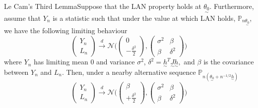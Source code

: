 \documentclass[twoside]{article}
\newcommand{\prob}{\mathbb{P}}
\newcommand{\utilde}{\underset{\sim}}
\begin{document}
\begin{theorem_exam}{Le Cam's Third Lemma}{}Suppose that the LAN property holds at $\utilde{\theta_0}$. Furthermore, assume that $Y_n$ is a statistic such that under the value at which LAN holds, $\prob_{n\utilde{\theta_0}}$, we have the following limiting behaviour 
\begin{equation}
\begin{pmatrix}
Y_n\\
L_n
\end{pmatrix}
 \xrightarrow{d} \mathcal{N}
\bigg( 
\begin{pmatrix}
0 \\
-\frac{\delta^2}{2}
\end{pmatrix}
,
\begin{pmatrix}
\sigma^2 & \beta \\
\beta & \delta^2
\end{pmatrix}
\bigg)
\tag{*}
\end{equation}
where $Y_n$ has limiting mean $0$ and variance $\sigma^2$, $\delta^2 = \utilde{h}^T\utilde{J}\utilde{h},$ and $\beta$ is the covariance between $Y_n$ and $L_n.$ Then, under a nearby alternative sequence $\prob_{n(\utilde{\theta_0} + n^{-1/2}\utilde{h})}$
\begin{equation}
\begin{pmatrix}
Y_n\\
L_n
\end{pmatrix}
 \xrightarrow{d} \mathcal{N}
\bigg( 
\begin{pmatrix}
\beta \\
+\frac{\delta^2}{2}
\end{pmatrix}
,
\begin{pmatrix}
\sigma^2 & \beta \\
\beta & \delta^2
\end{pmatrix}
\bigg)
\tag{**}
\end{equation}
\end{theorem_exam}
\end{document}
